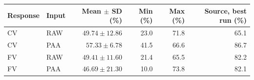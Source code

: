 \begin{tabular}{llrrrr}
\toprule
Response & Input & Mean $\pm$ SD (\%) & Min (\%) & Max (\%) & Source, best run (\%) \\
\midrule
CV & RAW & $49.74 \pm 12.86$ & 23.0 & 71.8 & 65.1 \\
CV & PAA & $57.33 \pm 6.78$ & 41.5 & 66.6 & 86.7 \\
FV & RAW & $49.41 \pm 11.60$ & 21.4 & 65.5 & 82.2 \\
FV & PAA & $46.69 \pm 21.30$ & 10.0 & 73.8 & 82.1 \\
\bottomrule
\end{tabular}
